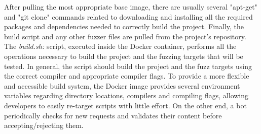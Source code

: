 \newline
After pulling the most appropriate base image, there are usually several "apt-get" and "git clone" commands related to downloading and installing all the required packages and dependencies needed to correctly build the project.
\newline
Finally, the build script and any other fuzzer files are pulled from the project's repository.
\newline \newline
The \textit{build.sh:} script, executed inside the Docker container, performs all the operations necessary to build the project and the fuzzing targets that will be tested.
\newline
In general, the script should build the project and the fuzz targets using the correct compiler and appropriate compiler flags.
\newline
To provide a more flexible and accessible build system, the Docker image provides several environment variables regarding directory locations, compilers and compiling flags, allowing developers to easily re-target scripts with little effort.
\newline \newline \newline
On the other end, a bot periodically checks for new requests and validates their content before accepting/rejecting them.





